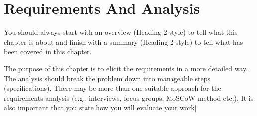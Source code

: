 \chapter{Requirements And Analysis}
You should always start with an overview (Heading 2 style) to tell what this chapter is about and finish with a summary (Heading 2 style) to tell what has been covered in this chapter.

The purpose of this chapter is to elicit the requirements in a more detailed way. The analysis should break the problem down into manageable steps (specifications). There may be more than one suitable approach for the requirements analysis (e.g., interviews, focus groups, MoSCoW method etc.). It is also important that you state how you will evaluate your work]

